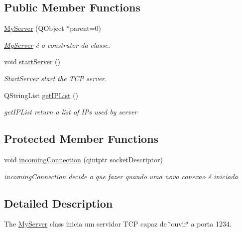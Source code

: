 \subsection*{Public Member Functions}
\begin{DoxyCompactItemize}
\item 
\mbox{\hyperlink{class_my_server_ac9e5ca7b551a5df90d5b39260f7e5404}{My\+Server}} (Q\+Object $\ast$parent=0)
\begin{DoxyCompactList}\small\item\em \mbox{\hyperlink{class_my_server}{My\+Server}} é o construtor da classe. \end{DoxyCompactList}\item 
\mbox{\label{class_my_server_a962f0e205a0aaf08b12d50d1315a8c90}} 
void \mbox{\hyperlink{class_my_server_a962f0e205a0aaf08b12d50d1315a8c90}{start\+Server}} ()
\begin{DoxyCompactList}\small\item\em Start\+Server start the T\+CP server. \end{DoxyCompactList}\item 
Q\+String\+List \mbox{\hyperlink{class_my_server_ac10d498dcc2b5d691f131f17b6602a59}{get\+I\+P\+List}} ()
\begin{DoxyCompactList}\small\item\em get\+I\+P\+List return a list of I\+Ps used by server \end{DoxyCompactList}\end{DoxyCompactItemize}
\subsection*{Protected Member Functions}
\begin{DoxyCompactItemize}
\item 
void \mbox{\hyperlink{class_my_server_a635c7a1e6817285ffb1a2a3842df010b}{incoming\+Connection}} (qintptr socket\+Descriptor)
\begin{DoxyCompactList}\small\item\em incoming\+Connection decide o que fazer quando uma nova conexao é iniciada \end{DoxyCompactList}\end{DoxyCompactItemize}


\subsection{Detailed Description}
The \mbox{\hyperlink{class_my_server}{My\+Server}} class inicia um servidor T\+CP capaz de \char`\"{}ouvir\char`\"{} a porta 1234. 

